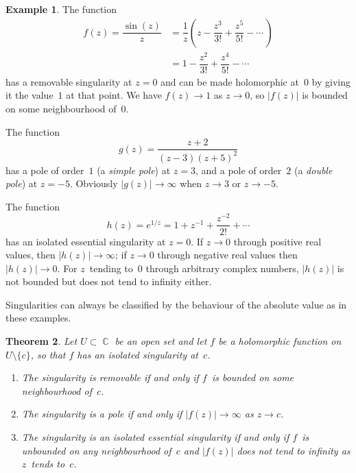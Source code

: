\documentclass{amsproc}
\newtheorem{theorem}{Theorem}[subsection]
\theoremstyle{definition}
\newtheorem{example}[theorem]{Example}
\theoremstyle{remark}
\DeclareMathOperator{\C}{\mathbb{C}}
\numberwithin{equation}{section}
\begin{document}
\begin{example} \label{CME11.4}
The function
\begin{align*}
f(z) = \dfrac{\sin(z)}{z}
&= \dfrac{1}{z}\left(z - \dfrac{z^3}{3!} + \dfrac{z^5}{5!} - \cdots\,\right) \\
&= 1 - \dfrac{z^2}{3!} + \dfrac{z^4}{5!} - \cdots
\end{align*}
has a removable singularity at $ z = 0 $ and can be made holomorphic at~$ 0 $ by giving it the value~$ 1 $ at that point. We have $ f(z) \to 1 $ as $ z \to 0 $, so $ |f(z)| $
is bounded on some neighbourhood of~$ 0 $.

The function
$$
g(z) = \dfrac{z + 2}{(z - 3)(z + 5)^2}
$$
has a pole of order~$ 1 $ (a \emph{simple pole}) at $ z = 3 $, and a pole of order~$ 2 $ (a \emph{double pole}) at $ z = -5 $. Obviously $ |g(z)| \to \infty $
when $ z \to 3 $ or $ z \to -5 $.

The function
$$
h(z) = e^{1/z} = 1 + z^{-1} + \dfrac{z^{-2}}{2!} + \cdots
$$
has an isolated essential singularity at $ z = 0 $. If $ z \to 0 $ through positive real values, then $ |h(z)| \to \infty $; if $ z \to 0 $ through negative real values
then $ |h(z)| \to 0 $. For $ z $~tending to~$ 0 $ through arbitrary complex numbers, $ |h(z)| $ is not bounded but does not tend to infinity either.
\end{example}

Singularities can always be classified by the behaviour of the absolute value as in these examples.

\begin{theorem} \label{CMT11.5}
Let $ U \subset \C $ be an open set and let $ f $ be a holomorphic function on $ U \setminus \{c\} $, so that $ f $ has an isolated singularity at~$ c $.
\begin{enumerate}
\item The singularity is removable if and only if $ f $~is bounded on some neighbourhood of~$ c $.
\item The singularity is a pole if and only if $ |f(z)| \to \infty $ as $ z \to c $.
\item The singularity is an isolated essential singularity if and only if $ f $~is unbounded on any neighbourhood of~$ c $ and $ |f(z)| $ does not tend to infinity
as $ z $~tends to~$ c $.
\end{enumerate}
\end{theorem}
\end{document}
